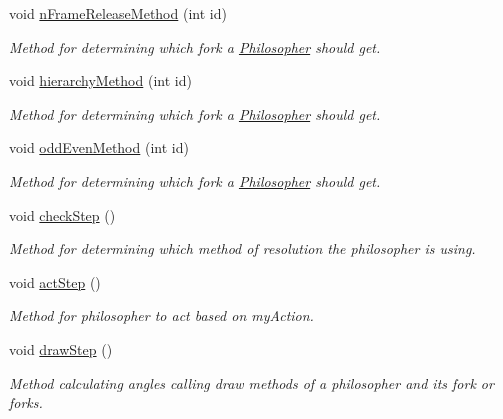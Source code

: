 \begin{DoxyCompactItemize}
void \hyperlink{class_table_a1c74d808d5a9c287194467fe766c27ad}{n\+Frame\+Release\+Method} (int id)
\begin{DoxyCompactList}\small\item\em Method for determining which fork a \hyperlink{class_philosopher}{Philosopher} should get. \end{DoxyCompactList}\item 
void \hyperlink{class_table_a72f12ad53efb6444fb07f29ced36555e}{hierarchy\+Method} (int id)
\begin{DoxyCompactList}\small\item\em Method for determining which fork a \hyperlink{class_philosopher}{Philosopher} should get. \end{DoxyCompactList}\item 
void \hyperlink{class_table_a9a4f2d947df11a5c59f973a0b2e22094}{odd\+Even\+Method} (int id)
\begin{DoxyCompactList}\small\item\em Method for determining which fork a \hyperlink{class_philosopher}{Philosopher} should get. \end{DoxyCompactList}\item 
\mbox{\label{class_table_a21bc911294bcde283e4a565658d22e22}} 
void \hyperlink{class_table_a21bc911294bcde283e4a565658d22e22}{check\+Step} ()
\begin{DoxyCompactList}\small\item\em Method for determining which method of resolution the philosopher is using. \end{DoxyCompactList}\item 
\mbox{\label{class_table_a9972f4f37add62fb85c3b7206d536113}} 
void \hyperlink{class_table_a9972f4f37add62fb85c3b7206d536113}{act\+Step} ()
\begin{DoxyCompactList}\small\item\em Method for philosopher to act based on my\+Action. \end{DoxyCompactList}\item 
\mbox{\label{class_table_a1f0bde7c17707c4397bdde95b5980991}} 
void \hyperlink{class_table_a1f0bde7c17707c4397bdde95b5980991}{draw\+Step} ()
\begin{DoxyCompactList}\small\item\em Method calculating angles calling draw methods of a philosopher and its fork or forks. \end{DoxyCompactList}\end{DoxyCompactItemize}


